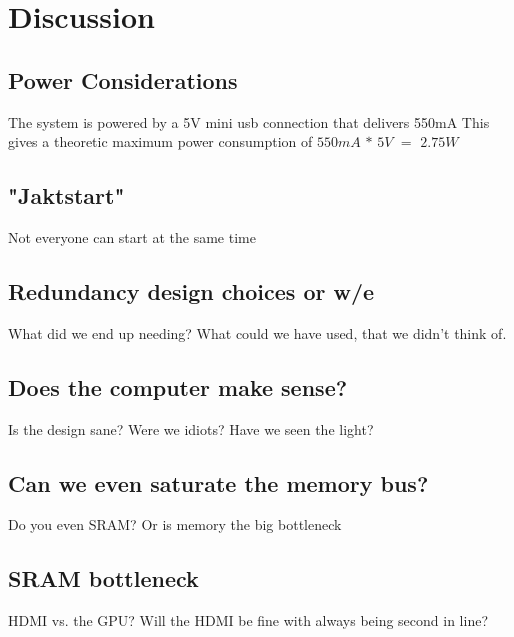 \documentclass[../main/report.tex]{subfiles}
\begin{document}
\chapter{Discussion}




\section{Power Considerations}

The system is powered by a 5V mini usb connection that delivers 550mA 
This gives a theoretic maximum power consumption of $550mA$ $*$ $5V$ $=$ $2.75W$


\section{"Jaktstart"}

Not everyone can start at the same time

\section{Redundancy design choices or w/e}
What did we end up needing?
What could we have used, that we didn't think of.

\section{Does the computer make sense?}
Is the design sane?
Were we idiots?
Have we seen the light?

\section{Can we even saturate the memory bus?}
Do you even SRAM?
Or is memory the big bottleneck

\section{SRAM bottleneck}
HDMI vs. the GPU?
Will the HDMI be fine with always being second in line?
\end{document}
